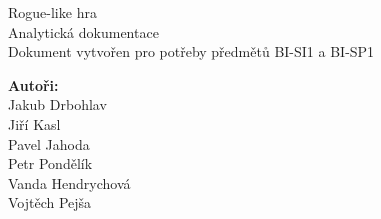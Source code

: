 \documentclass[12pt,a4paper]{article}
\begin{document}



\renewcommand{\headrulewidth}{0pt}
\renewcommand{\footrulewidth}{0pt}

\begin{titlepage}
  \thispagestyle{fancy}

	\vspace*{\fill}
	\begin{center}
    {\fontsize{28.83}{100}\selectfont Rogue-like hra}\\[0.6cm] %
		{\fontsize{15.74}{40}\selectfont Analytická dokumentace}\\[1.5cm]
    {\fontsize{10}{10} \selectfont Dokument vytvořen pro potřeby předmětů
    BI-SI1 a BI-SP1}\\
	\end{center}

	\vspace*{\fill}

  {\fontsize{10}{10} \selectfont \noindent
\textbf{Autoři:}\\
  Jakub Drbohlav\\
  Jiří Kasl\\
  Pavel Jahoda\\
  Petr Pondělík\\
  Vanda Hendrychová\\
  Vojtěch Pejša\\
  }
\end{titlepage}

\newpage

\renewcommand{\headrulewidth}{0.4pt}
\renewcommand{\footrulewidth}{0.4pt}






\tableofcontents

\newpage

\listoffigures

\newpage
\end{document}
